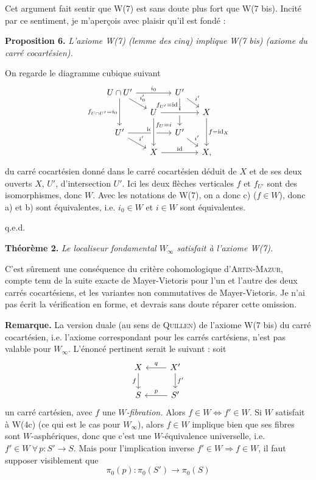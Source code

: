 \documentclass[11pt]{article}
\newcommand{\printedpage}[1]{\marginpar{\footnotesize p.~#1}}
\newcommand{\msp}[1]{\marginpar{\footnotesize [#1]}}
\begin{document}
Cet argument fait sentir que W(7) est sans doute plus fort que W(7 bis). Incité par ce sentiment, je m'aperçois avec plaisir qu'il est fondé :

\printedpage{57}

\msp{page 78}
\textbf{Proposition 6.} \textit{L'axiome \textup{W(7)} (lemme des cinq) implique \textup{W(7 bis)} (axiome du carré cocartésien).}

On regarde le diagramme cubique suivant
\[
\begin{tikzcd}[row sep=small, column sep=small]
U\cap U' \arrow[rr, "i_0"] \arrow[dr, "i'_0"] \arrow[dd, "f_{U\cap U'}=i_0"'] & & U' \arrow[dr, "i'"] \arrow[dd, "f_{U'}=\mathrm{id}"{swap,pos=.25}] & \\
& U \arrow[rr, crossing over, "i"] & & X \arrow[dd, "f=\mathrm{id}_X"] \\
U' \arrow[rr, "\mathrm{id}"] \arrow[dr, "i'"] & & U' \arrow[dr, "i'"] & \\
& X \arrow[rr, "\mathrm{id}"] \arrow[from=uu, crossing over, "f_U=i"{pos=.25}] & & X,
\end{tikzcd}
\]
du carré cocartésien donné dans le carré cocartésien déduit de $X$ et de ses deux ouverts $X$, $U'$, d'intersection $U'$. Ici les deux flèches verticales $f$ et $f_{U'}$ sont des isomorphismes, donc $W$. Avec les notations de W(7), on a donc c) ($f\in W$), donc a) et b) sont équivalentes, i.e. $i_0\in W$ et $i\in W$ sont équivalentes.

\hfill q.e.d.

\textbf{Théorème 2.} \textit{Le localiseur fondamental $W_\infty$ satisfait à l'axiome \textup{W(7)}.}

C'est sûrement une conséquence du critère cohomologique d'\textsc{Artin-Mazur}, compte tenu de la suite exacte de Mayer-Vietoris pour l'un et l'autre des deux carrés cocartésiens, et les variantes non commutatives de Mayer-Vietoris. Je n'ai pas écrit la vérification en forme, et devrais sans doute réparer cette omission.

\msp{page 79}
\textbf{Remarque.} La version duale (au sens de \textsc{Quillen}) de l'axiome W(7 bis) du carré cocartésien, i.e. l'axiome correspondant pour les carrés cartésiens, n'est pas valable pour $W_\infty$. L'énoncé pertinent serait le suivant : soit
\[
\begin{tikzcd}
X & X' \arrow[l, "q"'] \arrow[d, "f'"] \\
S & S' \arrow[l, "p"']
\arrow[from=1-1, to=2-1, "f"']
\end{tikzcd}
\]
un carré cartésien, avec $f$ une \textit{$W$-fibration.} Alors $f\in W\Longleftrightarrow f'\in W$. Si $W$ satisfait à W(4c) (ce qui est le cas pour $W_\infty$), alors $f\in W$ implique bien que ses fibres sont $W$-asphériques, donc que c'est une $W$-équivalence universelle, i.e. $f'\in W\ \forall\, p:S'\longrightarrow S$. Mais pour l'implication inverse $f'\in W\Longrightarrow f\in W$, il faut supposer visiblement que
\[
\pi_0(p):\pi_0(S')\longrightarrow\pi_0(S)
\]
\end{document}

